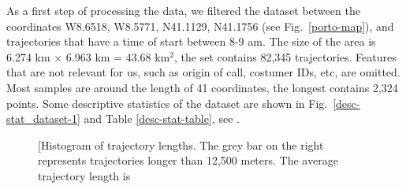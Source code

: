 \documentclass[b5paper,12pt]{report}
\theoremstyle{definition}
\begin{document}
As a first step of processing the data, we filtered the dataset between the coordinates W8.6518, W8.5771, N41.1129, N41.1756 (see Fig.~\ref{porto-map}), and trajectories that have a time of start between 8-9 am. The size of the area is 6.274 km $\times$ 6.963 km = 43.68 km$^2$, the set contains 82,345 trajectories. Features that are not relevant for us, such as origin of call, costumer IDs, etc, are omitted. Most samples are around the length of 41 coordinates, the longest contains 2,324 points. Some descriptive statistics of the dataset are shown in Fig.~\ref{desc-stat_dataset-1} and Table \ref{desc-stat-table}, see \cite{dssv-talk}.

\begin{figure}[h!]
\begin{minipage}{.495\linewidth}
\centering
{}
\end{minipage}
\begin{minipage}{.495\linewidth}
\centering
\subfigure[Histogram of trajectory lengths. The grey bar on the right represents
trajectories longer than 12,500 meters. The average trajectory length is

\end{minipage}
\end{figure}
\end{document}
